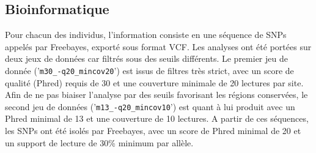 
\subsection{Bioinformatique}

Pour chacun des individus, l'information consiste en une séquence de SNPs appelés par Freebayes, exporté sous format VCF.
 Les analyses ont été portées sur deux jeux de données car filtrés sous des seuils différents.
 Le premier jeu de donnée ('\verb|m30_-q20_mincov20|') est issus de filtres très strict, avec un score de qualité (Phred) requis de 30 et une couverture minimale de 20 lectures par site.
 Afin de ne pas biaiser l'analyse par des seuils favorisant les régions conservées, le second jeu de données ('\verb|m13_-q20_mincov10|') est quant à lui produit avec un Phred minimal de 13 et une couverture de 10 lectures.
 A partir de ces séquences, les SNPs ont été isolés par Freebayes, avec un score de Phred minimal de 20 et un support de lecture de 30\% minimum par allèle.

